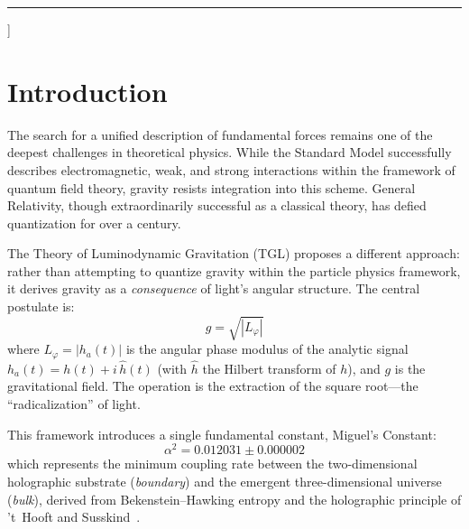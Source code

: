 \documentclass[12pt,a4paper,twocolumn]{article}
\newcommand{\alphaii}{\alpha^{2}}
\newcommand{\boundary}{\textit{boundary}}
\newcommand{\bulk}{\textit{bulk}}
\begin{document}
\begin{@twocolumnfalse}
\begin{abstract}
\medskip
\noindent\textbf{Keywords:} gravitational waves, gravitational echoes, holographic principle, anti-tautology, Hilbert floor, fractal hierarchy, TGL, Miguel's Constant.
    \end{abstract}
    \vspace{0.5em}
    \rule{\textwidth}{0.4pt}
    \vspace{0.5em}
  \end{@twocolumnfalse}
]


\section{Introduction}
\label{sec:introduction}

The search for a unified description of fundamental forces remains one of the deepest challenges in theoretical physics. While the Standard Model successfully describes electromagnetic, weak, and strong interactions within the framework of quantum field theory, gravity resists integration into this scheme. General Relativity, though extraordinarily successful as a classical theory, has defied quantization for over a century.

The Theory of Luminodynamic Gravitation (TGL) proposes a different approach: rather than attempting to quantize gravity within the particle physics framework, it derives gravity as a \emph{consequence} of light's angular structure. The central postulate is:
\begin{equation}
\label{eq:radical}
g = \sqrt{|L_\varphi|}
\end{equation}
where $L_\varphi = |h_a(t)|$ is the angular phase modulus of the analytic signal $h_a(t) = h(t) + i\,\hat{h}(t)$ (with $\hat{h}$ the Hilbert transform of $h$), and $g$ is the gravitational field. The operation is the extraction of the square root---the ``radicalization'' of light.

This framework introduces a single fundamental constant, Miguel's Constant:
\begin{equation}
\label{eq:alpha2}
\alphaii = 0.012031 \pm 0.000002
\end{equation}
which represents the minimum coupling rate between the two-dimensional holographic substrate (\boundary) and the emergent three-dimensional universe (\bulk), derived from Bekenstein--Hawking entropy and the holographic principle of 't~Hooft and Susskind~\cite{tHooft1993,Susskind1995,Bekenstein1973}.
\end{document}
